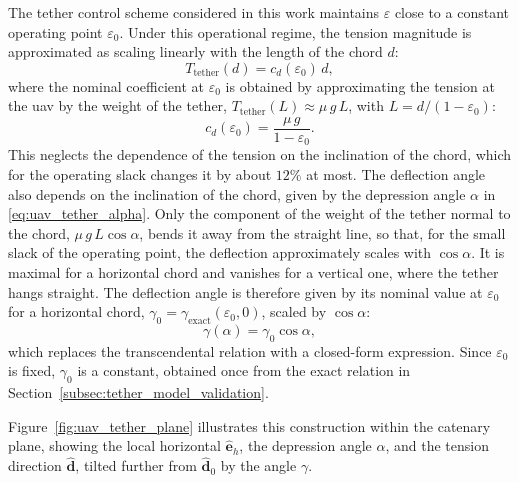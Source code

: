 The tether control scheme considered in this work maintains $\varepsilon$ close to a constant operating point $\varepsilon_0$. Under this operational regime, the tension magnitude is approximated as scaling linearly with the length of the chord $d$:
\begin{equation}
    T_{\mathrm{tether}}(d) = c_d(\varepsilon_0)\,d,
    \label{eq:uav_tether_magnitude}
\end{equation}
where the nominal coefficient at $\varepsilon_0$ is obtained by approximating the tension at the \gls{uav} by the weight of the tether, $T_{\mathrm{tether}}(L) \approx \mu\,g\,L$, with $L = d/(1-\varepsilon_0)$:
\begin{equation}
    c_d(\varepsilon_0) = \frac{\mu\,g}{1 - \varepsilon_0}.
    \label{eq:uav_tether_cd_nominal}
\end{equation}
This neglects the dependence of the tension on the inclination of the chord, which for the operating slack changes it by about $12\%$ at most. The deflection angle also depends on the inclination of the chord, given by the depression angle $\alpha$ in \eqref{eq:uav_tether_alpha}. Only the component of the weight of the tether normal to the chord, $\mu\,g\,L\cos\alpha$, bends it away from the straight line, so that, for the small slack of the operating point, the deflection approximately scales with $\cos\alpha$. It is maximal for a horizontal chord and vanishes for a vertical one, where the tether hangs straight. The deflection angle is therefore given by its nominal value at $\varepsilon_0$ for a horizontal chord, $\gamma_0 = \gamma_{\mathrm{exact}}(\varepsilon_0, 0)$, scaled by $\cos\alpha$:
\begin{equation}
    \gamma(\alpha) = \gamma_0\cos\alpha,
    \label{eq:uav_tether_nominal}
\end{equation}
which replaces the transcendental relation with a closed-form expression. Since $\varepsilon_0$ is fixed, $\gamma_0$ is a constant, obtained once from the exact relation in Section~\ref{subsec:tether_model_validation}.

Figure~\ref{fig:uav_tether_plane} illustrates this construction within the catenary plane, showing the local horizontal $\hat{\mathbf{e}}_h$, the depression angle $\alpha$, and the tension direction $\hat{\mathbf{d}}$, tilted further from $\hat{\mathbf{d}}_0$ by the angle $\gamma$.

